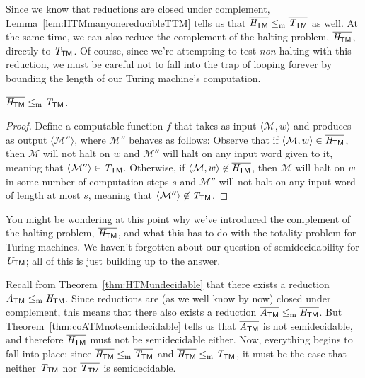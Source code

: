 Since we know that reductions are closed under complement, Lemma~\ref{lem:HTMmanyonereducibleTTM} tells us that $\overline{\mathit{H}_{\textsf{TM}}} \leq_{\mathrm{m}} \overline{\mathit{T}_{\textsf{TM}}}$ as well. At the same time, we can also reduce the complement of the halting problem, $\overline{\mathit{H}_{\textsf{TM}}}$, directly to $\mathit{T}_{\textsf{TM}}$. Of course, since we're attempting to test \emph{non-}halting with this reduction, we must be careful not to fall into the trap of looping forever by bounding the length of our Turing machine's computation.

\begin{lemma}\label{lem:HTMmanyonereduciblecoTTM}
$\overline{\mathit{H}_{\textsf{TM}}} \leq_{\mathrm{m}} \mathit{T}_{\textsf{TM}}$.

\begin{proof}
Define a computable function $f$ that takes as input $\langle \mathcal{M}, w \rangle$ and produces as output $\langle \mathcal{M}'' \rangle$, where $\mathcal{M}''$ behaves as follows:
Observe that if $\langle \mathcal{M}, w \rangle \in \overline{\mathit{H}_{\textsf{TM}}}$, then $\mathcal{M}$ will not halt on $w$ and $\mathcal{M}''$ will halt on any input word given to it, meaning that $\langle \mathcal{M}'' \rangle \in \mathit{T}_{\textsf{TM}}$. Otherwise, if $\langle \mathcal{M}, w \rangle \not\in \overline{\mathit{H}_{\textsf{TM}}}$, then $\mathcal{M}$ will halt on $w$ in some number of computation steps $s$ and $\mathcal{M}''$ will not halt on any input word of length at most $s$, meaning that $\langle \mathcal{M}'' \rangle \not\in \mathit{T}_{\textsf{TM}}$.
\end{proof}
\end{lemma}

You might be wondering at this point why we've introduced the complement of the halting problem, $\overline{\mathit{H}_{\textsf{TM}}}$, and what this has to do with the totality problem for Turing machines. We haven't forgotten about our question of semidecidability for $\mathit{U}_{\textsf{TM}}$; all of this is just building up to the answer.

Recall from Theorem~\ref{thm:HTMundecidable} that there exists a reduction $\mathit{A}_{\textsf{TM}} \leq_{\mathrm{m}} \mathit{H}_{\textsf{TM}}$. Since reductions are (as we well know by now) closed under complement, this means that there also exists a reduction $\overline{\mathit{A}_{\textsf{TM}}} \leq_{\mathrm{m}} \overline{\mathit{H}_{\textsf{TM}}}$. But Theorem~\ref{thm:coATMnotsemidecidable} tells us that $\overline{\mathit{A}_{\textsf{TM}}}$ is not semidecidable, and therefore $\overline{\mathit{H}_{\textsf{TM}}}$ must not be semidecidable either. Now, everything begins to fall into place: since $\overline{\mathit{H}_{\textsf{TM}}} \leq_{\mathrm{m}} \overline{\mathit{T}_{\textsf{TM}}}$ and $\overline{\mathit{H}_{\textsf{TM}}} \leq_{\mathrm{m}} \mathit{T}_{\textsf{TM}}$, it must be the case that neither $\mathit{T}_{\textsf{TM}}$ nor $\overline{\mathit{T}_{\textsf{TM}}}$ is semidecidable.

